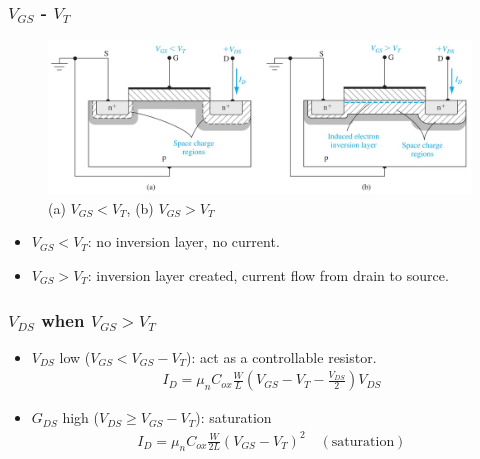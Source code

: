 \documentclass{beamer}
\begin{document}
    \begin{frame} \frametitle{$V_{GS}$ - $V_{T} $}
        \begin{figure}[H]
            \centering
            \includegraphics[width=0.9\linewidth]{Current-voltage-relationship.jpg}
            \caption{(a) $V_{GS} < V_T$, (b) $V_{GS} > V_T$}
            \label{fig:Current-voltage-relationship.jpg}
        \end{figure}
        \begin{itemize}
            \item $V_{GS} < V_T$: no inversion layer, no current.
            \item $V_{GS} > V_T$: inversion layer created, current flow from drain to source.
        \end{itemize}
    \end{frame}

    \begin{frame} \frametitle{$V_{DS} $ when $V_{GS} > V_{T} $}
        \begin{itemize}
            \item $V_{DS} $ low ($V_{GS} < V_{GS} - V_T$): act as a controllable resistor.
            \begin{equation*}
                \begin{aligned}
                    \boxed{I_D = \mu_n C_{ox} \frac{W}{L} \left( V_{GS}  - V_T - \frac{V_{DS}}{2}  \right) V_{DS}}
                \end{aligned}
            \end{equation*}
            \item $G_{DS}$ high ($V_{DS} \ge V_{GS} - V_T $): saturation
            \begin{equation*}
                \begin{aligned}
                    \boxed{I_D = \mu_n C_{ox} \frac{W}{2L} \left( V_{GS} - V_T \right)^2 \quad (\text{saturation})}
                \end{aligned}
            \end{equation*}
        \end{itemize}
    \end{frame}
\end{document}
